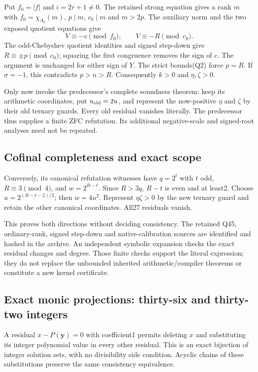 Put $f_0=|f|$ and $i=2r+1\ne0$. The retained strong equation gives a rank
$m$ with $f_0=\chi_{A_0}(m)$, $p\mid m$, $c_0\mid m$ and $m>2p$.
The auxiliary norm and the two exposed quotient equations give
\[
 V\equiv-c\pmod{f_0},\qquad V\equiv-R\pmod{c_0}.
\]
The odd-Chebyshev quotient identities and signed step-down give
$R\equiv\pm p\pmod{c_0}$; squaring the first congruence removes the sign
of $c$. The argument is unchanged for either sign of $Y$. The strict
bounds(Q2) force $p=R$. If $\sigma=-1$, this contradicts $p>n>R$.
Consequently $k>0$ and $\eta,\zeta>0$.

Only now invoke the predecessor's complete soundness theorem: keep its
arithmetic coordinates, put $u_{\rm old}=2u$, and represent the now-positive
$\eta$ and $\zeta$ by their old ternary guards. Every old residual vanishes
literally. The predecessor thus supplies a finite ZFC refutation. Its
additional negative-scale and signed-root analyses need not be repeated.

\subsection{Cofinal completeness and exact scope}
Conversely, its canonical refutation witnesses have $q=2^t$ with $t$ odd,
$R\equiv3\pmod4$, and $w=2^{R-t}$. Since $R>3q$, $R-t$ is even and at
least2. Choose $u=2^{(R-t-2)/2}$; then $w=4u^2$. Represent
$\eta\zeta>0$ by the new ternary guard and retain the other canonical
coordinates. All27 residuals vanish.

This proves both directions without deciding consistency. The retained
Q45, ordinary-rank, signed step-down and native-calibration sources are
identified and hashed in the archive. An independent symbolic expansion
checks the exact residual changes and degree. Those finite checks support
the literal expression; they do not replace the unbounded inherited
arithmetic/compiler theorems or constitute a new kernel certificate.

\subsection{Exact monic projections: thirty-six and thirty-two integers}
A residual $x-P(\mathbf y)=0$ with coefficient1 permits deleting $x$ and
substituting its integer polynomial value in every other residual. This
is an exact bijection of integer solution sets, with no divisibility
side condition. Acyclic chains of these substitutions preserve the same
consistency equivalence.

